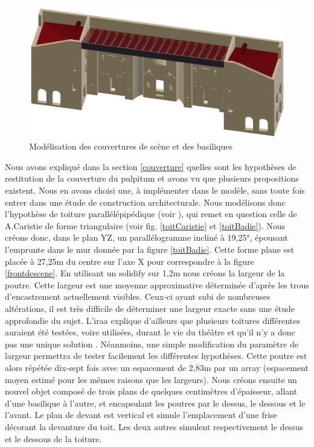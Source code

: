 \begin{figure}[!h]
	\includegraphics[width=\linewidth]{images/modCouvertures}
	\caption{Modélisation des couvertures de scène et des basiliques} 
	\label{modCouvertures} 
\end{figure} 
Nous avons expliqué dans la section \ref{couverture} quelles sont les hypothèses de restitution de la couverture du \gls{pulpitum} et avons vu que plusieurs propositions existent. Nous en avons choisi une, à implémenter dans le modèle, sans toute fois entrer dans une étude de construction architecturale. Nous modélisons donc l'hypothèse de toiture parallélépipédique (voir \cite[Chap. I, sect. 6]{orangeTxt}), qui remet en question celle de A.Caristie de forme triangulaire (voir fig. \ref{toitCaristie} et \ref{toitBadie}). Nous créons donc, dans le plan YZ, un parallélogramme incliné à 19,25°, épousant l'emprunte dans le mur donnée par la figure \ref{toitBadie}. Cette forme plane est placée à 27,25m du centre sur l'axe X pour correspondre à la figure \ref{frontdescene}. En utilisant un \gls{solidify} sur 1,2m nous créons la largeur de la poutre. Cette largeur est une moyenne approximative déterminée d'après les trous d'encastrement actuellement visibles. Ceux-ci ayant subi de nombreuses altérations, il est très difficile de déterminer une largeur exacte sans une étude approfondie du sujet. L'\gls{iraa} explique d'ailleurs que plusieurs toitures différentes auraient été testées, voire utilisées, durant le vie du théâtre et qu'il n'y a donc pas une unique solution \cite[p. 34]{orangeTxt}. Néanmoins, une simple modification du paramètre de largeur permettra de tester facilement les différentes hypothèses. Cette poutre est alors répétée dix-sept fois avec un espacement de 2,83m par un \gls{array} (espacement moyen estimé pour les mêmes raisons que les largeurs). Nous créons ensuite un nouvel objet composé de trois plans de quelques centimètres d'épaisseur, allant d'une basilique à l'autre, et encapsulant les poutres par le dessus, le dessous et le l'avant. Le plan de devant est vertical et simule l'emplacement d'une frise décorant la devanture du toit. Les deux autres simulent respectivement le dessus et le dessous de la toiture.

